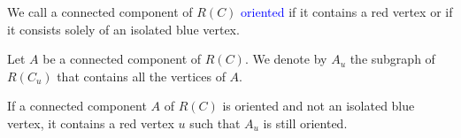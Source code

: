 \documentclass{beamer}
\theoremstyle{definition}
\def\spadding{\vspace{0.25cm}}
\def\b{\textcolor{blue}}
\begin{document}
\begin{frame}

\begin{definition}
We call a connected component of $R(C)$ \b{oriented} if it contains a red vertex or if it consists solely of an isolated blue vertex. \pause\spadding

Let $A$ be a connected component of $R(C)$. We denote by $A_u$ the subgraph of $R(C_u)$ that contains all the vertices of $A$.
\end{definition}\pause

\begin{lemma}
\label{lem:4}
If a connected component $A$ of $R(C)$ is oriented and not an isolated blue vertex, it contains a red vertex $u$ such that $A_u$ is still oriented.
\end{lemma}


\end{frame}
\end{document}
